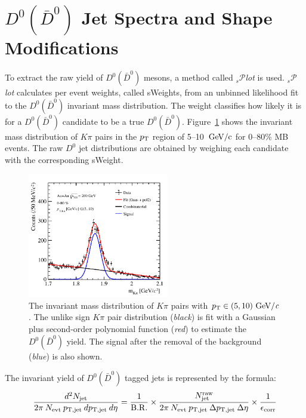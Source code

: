 \documentclass{appolb}
\begin{document}
\section{$D^{0} (\bar{D}^{0})$ Jet Spectra and Shape Modifications}
To extract the raw yield of $D^{0} (\bar{D}^{0})$ mesons, a method called $_s$\( \mathcal{P} \)\textit{lot} \cite{SPlot} is used. $_s$\( \mathcal{P} \)\textit{lot} calculates per event weights, called sWeights, from an unbinned likelihood fit to the $D^{0} (\bar{D}^{0})$ invariant mass distribution. The weight classifies how likely it is for a $D^{0} (\bar{D}^{0})$ candidate to be a true $D^{0} (\bar{D}^{0})$. \mbox{Figure \ref{fig:Invariant mass}} shows the invariant mass distribution of $K\pi$ pairs in the $p_{\rm T}$ region of \mbox{5–10 $\rm GeV/c$} for 0–80\% MB events. The raw $D^{0}$ jet distributions are obtained by weighing each candidate with the corresponding sWeight.
\begin{figure}[t]
    \centering
    \includegraphics[width=0.55\textwidth]{InvariantMassFits_5_10.pdf}
    \caption{The invariant mass distribution of $K\pi$ pairs with $p_{\rm T} \in (5, 10) \text{ GeV}/\textit{c}$. The unlike sign $K\pi$ pair distribution (\textit{black}) is fit with a Gaussian plus second-order polynomial function (\textit{red}) to estimate the $D^{0} (\bar{D}^{0})$ yield. The signal after the removal of the background (\textit{blue}) is also shown.}
    \label{fig:Invariant mass}
\end{figure}
The invariant yield of $D^{0} (\bar{D}^{0})$ tagged jets is represented by the formula:
\begin{equation}
    \frac{d^2N_{\rm jet}}{2\pi \: N_{\rm evt} \: p_{\rm T,jet} \: dp_{\rm T,jet} \: d\eta} = \frac{1}{\rm B.R.} \times \frac{N^{\rm raw}_{\rm jet}}{2\pi \: N_{\rm evt} \: p_{\rm T,jet} \: \Delta p_{\rm T,jet} \: \Delta\eta} \times \frac{1}{\epsilon_{\rm corr}}
\end{equation}
\end{document}
